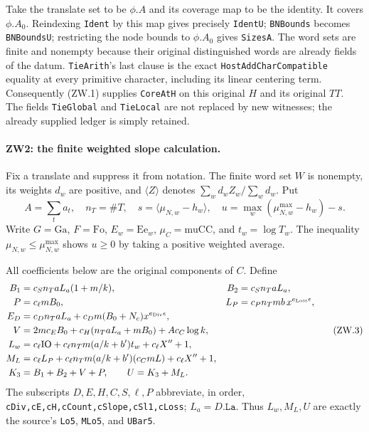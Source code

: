 Take the translate set to be $\phi.A$ and its coverage map to be the
identity.  It covers $\phi.A_0$.  Reindexing \texttt{Ident} by this map
gives precisely \texttt{IdentU}; \texttt{BNBounds} becomes
\texttt{BNBoundsU}; restricting the node bounds to $\phi.A_0$ gives
\texttt{SizesA}.  The word sets are finite and nonempty because their
original distinguished words are already fields of the datum.
\texttt{TieArith}'s last clause is the exact
\texttt{HostAddCharCompatible} equality at every primitive character,
including its linear centering term.  Consequently (ZW.1) supplies
\texttt{CoreAtH} on this original $H$ and its original $TT$.
The fields \texttt{TieGlobal} and \texttt{TieLocal} are not replaced by
new witnesses; the already supplied ledger is simply retained.

\paragraph{ZW2: the finite weighted slope calculation.}
\label{claim:ZW2}
Fix a translate and suppress it from notation.  The finite word set $W$
is nonempty, its weights $d_w$ are positive, and $\langle Z\rangle$
denotes $\sum_wd_wZ_w/\sum_wd_w$.  Put
\[
 A=\sum_ta_t,\quad n_T=\#T,\quad
 s=\langle\mu_{N,w}-h_w\rangle,\quad
 u=\max_w(\mu_{N,w}^{\max}-h_w)-s.
\]
Write $G=\mathrm{Ga}$, $F=\mathrm{Fo}$, $E_w=\mathrm{Ee}_w$,
$\mu_C=\mathrm{muCC}$, and $t_w=\log T_w$.  The inequality
$\mu_{N,w}\le\mu_{N,w}^{\max}$ shows $u\ge0$ by taking a
positive weighted average.

All coefficients below are the original components of $C$.  Define
\[
 \begin{aligned}
 B_1&=c_Sn_TaL_a(1+m/k),& B_2&=c_Sn_TaL_a,\\
 P&=c_\ell mB_0,&
 L_P&=c_Pn_Tmb\,x^{e_{\rm Loss}\epsilon},\\
 E_D&=c_Dn_TaL_a+c_Dm(B_0+N_c)x^{e_{\rm Div}\epsilon},\\
 V&=2mc_EB_0+c_H(n_TaL_a+mB_0)+Ac_C\log k,\\
 L_w&=c_\ell\mathrm{IO}
       +c_\ell n_Tm(a/k+b')t_w+c_\ell X''+1,\\
 M_L&=c_\ell L_P+c_\ell n_Tm(a/k+b')(c_CmL)+c_\ell X''+1,\\
 K_3&=B_1+B_2+V+P,\qquad U=K_3+M_L.
 \end{aligned}                                                     \tag{ZW.3}
\]
The subscripts $D,E,H,C,S,\ell,P$ abbreviate, in order,
\texttt{cDiv,cE,cH,cCount,cSlope,cSl1,cLoss}; $L_a=D.\texttt{La}$.
Thus $L_w,M_L,U$ are exactly the source's \texttt{Lo5},
\texttt{MLo5}, and \texttt{UBar5}.

